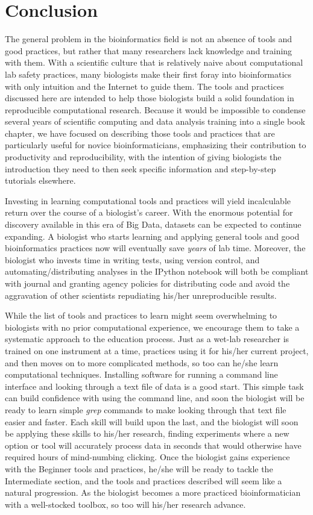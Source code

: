 \documentclass[ChapterTOCs,krantz2]{krantz} %
\begin{document}
\section{Conclusion}\label{conclusion}

The general problem in the
bioinformatics field is not an absence of tools and good practices, but rather
that many researchers lack knowledge and training with them.  With a scientific
culture that is relatively naive about computational lab safety practices, 
many biologists make their
first foray into bioinformatics with only intuition and the Internet to guide
them.  The tools and practices discussed here are intended to help
those biologists build a solid foundation in reproducible computational
research.  Because it would be impossible to condense several years of
scientific computing and data analysis training into a single book chapter, we
have focused on describing those tools and practices that are particularly
useful for novice bioinformaticians, emphasizing their contribution to 
productivity and reproducibility, with the intention of giving biologists the
introduction they need to then seek specific information and step-by-step
tutorials elsewhere. 

Investing in learning computational tools and practices will yield incalculable
return over the course of a biologist's career.  With the enormous potential
for discovery available in this era of Big Data, datasets can be expected to
continue expanding.  A biologist who starts learning and applying general tools
and good bioinformatics practices now will eventually save \emph{years} of lab time.
Moreover, the biologist who invests time in writing tests, using version
control, and automating/distributing analyses in the IPython notebook will both
be compliant with journal and granting agency policies for distributing code
and avoid the aggravation of other scientists repudiating his/her
unreproducible results.

While the list of tools and practices to learn might seem overwhelming to
biologists with no prior computational experience, we encourage them to take a
systematic approach to the education process.  Just as a wet-lab researcher is
trained on one instrument at a time, practices using it for
his/her current project, and then moves on to more complicated methods, so too
can he/she learn computational techniques.  Installing software for
running a command line interface and looking through a text file of data is a
good start.  This simple task can build confidence with using the command line,
and soon the biologist will be ready to learn simple \emph{grep} commands to make
looking through that text file easier and faster.  Each skill will build upon
the last, and the biologist will soon be applying these skills to his/her
research, finding experiments where a new option or tool will
accurately process data in seconds that would otherwise have required hours of
mind-numbing clicking.  Once the biologist gains experience with the Beginner
tools and practices, he/she will be ready to tackle the Intermediate section,
and the tools and practices described will seem like a natural progression.  As
the biologist becomes a more practiced bioinformatician with a well-stocked
toolbox, so too will his/her research advance.  
\end{document}
